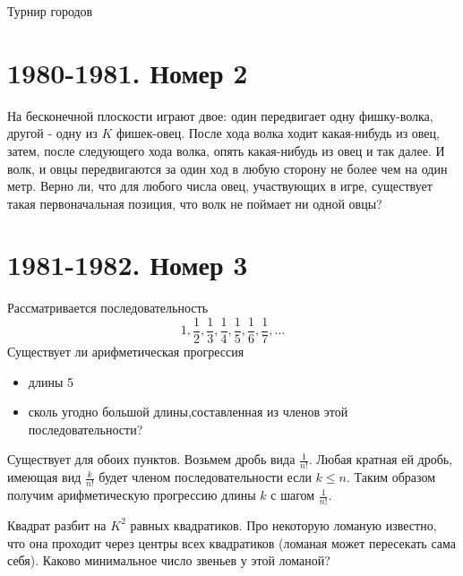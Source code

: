 \documentclass[11pt, a4paper]{problems_template}
\begin{document}
\begin{titlepage}
  \begin{center}
	\Huge{Турнир городов}
  \end{center}
\end{titlepage}

\chapter{1980-1981. Номер 2}

\begin{exercise}
На бесконечной плоскости играют двое: один передвигает одну фишку-волка, другой - одну из $K$ фишек-овец. После хода волка ходит какая-нибудь из овец, затем, после следующего хода волка, опять какая-нибудь из овец и так далее. И волк, и овцы передвигаются за один ход в любую сторону не более чем на один метр. Верно ли, что для любого числа овец, участвующих в игре, существует такая первоначальная позиция, что волк не поймает ни одной овцы?
\end{exercise}


\chapter{1981-1982. Номер 3}

\begin{exercise}
Рассматривается последовательность
$$
1, \frac{1}{2}, \frac{1}{3}, \frac{1}{4}, \frac{1}{5}, \frac{1}{6}, \frac{1}{7}, \dots
$$
Существует ли арифметическая прогрессия
\begin{itemize}
\item длины 5
\item сколь угодно большой длины,составленная из членов этой последовательности?
\end{itemize}
\end{exercise}
 
\begin{Solution}
Существует для обоих пунктов. Возьмем дробь вида $\frac{1}{n!}$. Любая кратная ей дробь, имеющая вид
$\frac{k}{n!}$ будет членом последовательности если $k \leqslant n$. Таким образом получим арифметическую прогрессию длины $k$ с шагом $\frac{1}{n!}$.
\end{Solution}

\begin{exercise}
Квадрат разбит на $K^{2}$ равных квадратиков. Про некоторую ломаную известно, что она проходит через центры всех квадратиков (ломаная может пересекать сама себя). Каково минимальное число звеньев у этой ломаной?
\end{exercise}
\end{document}
